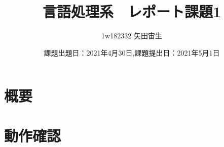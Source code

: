 \documentclass[dvipdfmx,uplatex,titlepage]{jsarticle}
\title{言語処理系　レポート課題1}
\author{1w182332 矢田宙生}
\date{課題出題日：2021年4月30日,課題提出日：2021年5月1日}
\begin{document}
\maketitle

\section{概要}



\section{動作確認}
\end{document}

